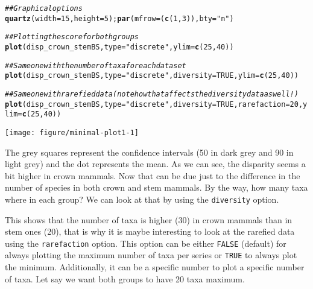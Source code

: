 \documentclass{article}\usepackage[]{graphicx}\usepackage[]{color}
\makeatletter
\newcommand{\hlnum}[1]{\textcolor[rgb]{0.686,0.059,0.569}{#1}}%
\newcommand{\hlstr}[1]{\textcolor[rgb]{0.192,0.494,0.8}{#1}}%
\newcommand{\hlcom}[1]{\textcolor[rgb]{0.678,0.584,0.686}{\textit{#1}}}%
\newcommand{\hlstd}[1]{\textcolor[rgb]{0.345,0.345,0.345}{#1}}%
\newcommand{\hlkwc}[1]{\textcolor[rgb]{0.333,0.667,0.333}{#1}}%
\newcommand{\hlkwd}[1]{\textcolor[rgb]{0.737,0.353,0.396}{\textbf{#1}}}%
\newenvironment{kframe}{%
 \def\at@end@of@kframe{}%
 \ifinner\ifhmode%
  \def\at@end@of@kframe{\end{minipage}}%
  \begin{minipage}{\columnwidth}%
 \fi\fi%
 \def\FrameCommand##1{\hskip\@totalleftmargin \hskip-\fboxsep
 \colorbox{shadecolor}{##1}\hskip-\fboxsep
     \hskip-\linewidth \hskip-\@totalleftmargin \hskip\columnwidth}%
 \MakeFramed {\advance\hsize-\width
   \@totalleftmargin\z@ \linewidth\hsize
   \@setminipage}}%
 {\par\unskip\endMakeFramed%
 \at@end@of@kframe}
\newenvironment{knitrout}{}{} %
\makeatother
\begin{document}
\begin{knitrout}
\color{fgcolor}\begin{kframe}
\begin{alltt}
\hlcom{## Graphical options}
\hlkwd{quartz}\hlstd{(}\hlkwc{width} \hlstd{=} \hlnum{15}\hlstd{,} \hlkwc{height} \hlstd{=} \hlnum{5}\hlstd{) ;} \hlkwd{par}\hlstd{(}\hlkwc{mfrow} \hlstd{= (}\hlkwd{c}\hlstd{(}\hlnum{1}\hlstd{,}\hlnum{3}\hlstd{)),} \hlkwc{bty} \hlstd{=} \hlstr{"n"}\hlstd{)}

\hlcom{## Plotting the score for both groups}
\hlkwd{plot}\hlstd{(disp_crown_stemBS,} \hlkwc{type} \hlstd{=} \hlstr{"discrete"} \hlstd{,} \hlkwc{ylim} \hlstd{=} \hlkwd{c}\hlstd{(}\hlnum{25}\hlstd{,}\hlnum{40}\hlstd{))}

\hlcom{## Same one with the number of taxa for each data set}
\hlkwd{plot}\hlstd{(disp_crown_stemBS,} \hlkwc{type} \hlstd{=} \hlstr{"discrete"}\hlstd{,} \hlkwc{diversity} \hlstd{=} \hlnum{TRUE}\hlstd{,} \hlkwc{ylim} \hlstd{=} \hlkwd{c}\hlstd{(}\hlnum{25}\hlstd{,}\hlnum{40}\hlstd{))}

\hlcom{## Same one with rarefied data (note how that affects the diversity data as well!)}
\hlkwd{plot}\hlstd{(disp_crown_stemBS,} \hlkwc{type} \hlstd{=} \hlstr{"discrete"}\hlstd{,} \hlkwc{diversity} \hlstd{=} \hlnum{TRUE}\hlstd{,} \hlkwc{rarefaction} \hlstd{=} \hlnum{20}\hlstd{,} \hlkwc{ylim} \hlstd{=} \hlkwd{c}\hlstd{(}\hlnum{25}\hlstd{,}\hlnum{40}\hlstd{))}
\end{alltt}
\end{kframe}

{\centering \texttt{[image: figure/minimal-plot1-1]} 

}



\end{knitrout}

The grey squares represent the confidence intervals (50 in dark grey and 90 in light grey) and the dot represents the mean. As we can see, the disparity seems a bit higher in crown mammals.
Now that can be due just to the difference in the number of species in both crown and stem mammals.
By the way, how many taxa where in each group? We can look at that by using the \texttt{diversity} option.

This shows that the number of taxa is higher (30) in crown mammals than in stem ones (20), that is why it is maybe interesting to look at the rarefied data using the \texttt{rarefaction} option.
This option can be either \texttt{FALSE} (default) for always plotting the maximum number of taxa per series or \texttt{TRUE} to always plot the minimum.
Additionally, it can be a specific number to plot a specific number of taxa.
Let say we want both groups to have 20 taxa maximum.
\end{document}
